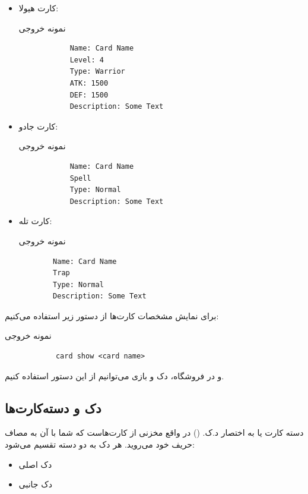 \documentclass[]{article}
\begin{document}
\newpage
\begin{itemize}

	\item کارت هیولا:
\begin{mybox}[colback=yellow]{نمونه خروجی}
	\begin{latin}	
		\begin{verbatim}
			Name: Card Name
			Level: 4
			Type: Warrior
			ATK: 1500
			DEF: 1500
			Description: Some Text
		\end{verbatim}
	\end{latin}
\end{mybox}	
	
	
		\item کارت جادو:
	\begin{mybox}[colback=yellow]{نمونه خروجی}
		\begin{latin}	
			\begin{verbatim}
			Name: Card Name
			Spell
			Type: Normal
			Description: Some Text
				\end{verbatim}
		\end{latin}
	\end{mybox}	


	\item کارت تله:
\begin{mybox}[colback=yellow]{نمونه خروجی}
	\begin{latin}	
		\begin{verbatim}
		Name: Card Name
		Trap
		Type: Normal
		Description: Some Text
			\end{verbatim}
	\end{latin}
\end{mybox}	
	
\end{itemize}


برای نمایش مشخصات کارت‌ها از دستور زیر استفاده می‌کنیم:
\begin{mybox}[colback=yellow]{نمونه خروجی}
	\begin{latin}	
		\begin{verbatim}
			card show <card name>
		\end{verbatim}
	\end{latin}
\end{mybox}	

و در فروشگاه، دک و بازی می‌توانیم از این دستور استفاده کنیم.




\subsection*{{\titr دک و دسته‌کارت‌ها}}
دسته کارت یا به اختصار د.ک. () در واقع مخزنی از کارت‌هاست که شما با 
آن به مصاف حریف خود می‌روید. هر دک به دو دسته تقسیم می‌شود:
\begin{itemize}
	\item
	دک اصلی
	\item
	دک جانبی
\end{itemize}
\end{document}

